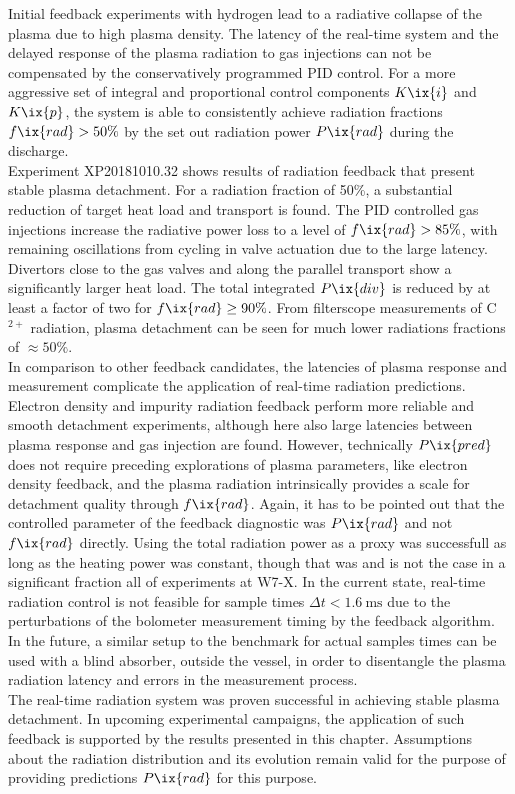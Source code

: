         Initial feedback experiments with hydrogen lead to a radiative collapse of the plasma due to high plasma density. The latency of the real-time system and the delayed response of the plasma radiation to gas injections can not be compensated by the conservatively programmed PID control. For a more aggressive set of integral and proportional control components $K\ix{i}$ and $K\ix{p}$, the system is able to consistently achieve radiation fractions $f\ix{rad}>50\%$ by the set out radiation power $P\ix{rad}$ during the discharge.\\%
        Experiment XP20181010.32 shows results of radiation feedback that present stable plasma detachment. For a radiation fraction of 50\%, a substantial reduction of target heat load and transport is found. The PID controlled gas injections increase the radiative power loss to a level of $f\ix{rad}>85\%$, with remaining oscillations from cycling in valve actuation due to the large latency. Divertors close to the gas valves and along the parallel transport show a significantly larger heat load. The total integrated $P\ix{div}$ is reduced by at least a factor of two for $f\ix{rad}\ge90\%$. From filterscope measurements of C$^{2+}$ radiation, plasma detachment can be seen for much lower radiations fractions of $\approx50\%$.\\%
        In comparison to other feedback candidates, the latencies of plasma response and measurement complicate the application of real-time radiation predictions. Electron density and impurity radiation feedback perform more reliable and smooth detachment experiments, although here also large latencies between plasma response and gas injection are found. However, technically $P\ix{pred}$ does not require preceding explorations of plasma parameters, like electron density feedback, and the plasma radiation intrinsically provides a scale for detachment quality through $f\ix{rad}$. Again, it has to be pointed out that the controlled parameter of the feedback diagnostic was $P\ix{rad}$ and not $f\ix{rad}$ directly. Using the total radiation power as a proxy was successfull as long as the heating power was constant, though that was and is not the case in a significant fraction all of experiments at W7-X. In the current state, real-time radiation control is not feasible for sample times $\Delta t<\SI{1.6}{\milli\second}$ due to the perturbations of the bolometer measurement timing by the feedback algorithm. In the future, a similar setup to the benchmark for actual samples times can be used with a blind absorber, outside the vessel, in order to disentangle the plasma radiation latency and errors in the measurement process.\\%
        The real-time radiation system was proven successful in achieving stable plasma detachment. In upcoming experimental campaigns, the application of such feedback is supported by the results presented in this chapter. Assumptions about the radiation distribution and its evolution remain valid for the purpose of providing predictions $P\ix{rad}$ for this purpose.%
%